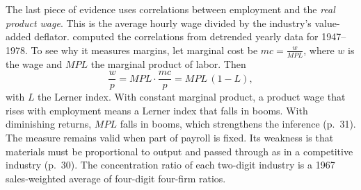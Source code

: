 The last piece of evidence uses correlations between employment and the \emph{real product wage}. This is the average
hourly wage divided by the industry's value-added deflator. \citet{Burda1984} computed the correlations from detrended
yearly data for 1947--1978. To see why it measures margins, let marginal cost be $mc = \frac{w}{MPL}$, where $w$ is the wage and $MPL$
the marginal product of labor. Then
\begin{equation*}
\frac{w}{p} = MPL \cdot \frac{mc}{p} = MPL\,(1 - L),
\end{equation*}
with $L$ the Lerner index. With constant marginal product, a product wage that rises with employment means a Lerner
index that falls in booms. With diminishing returns, $MPL$ falls in booms, which strengthens the inference (p.~31). The
measure remains valid when part of payroll is fixed. Its weakness is that materials must be proportional to output and
passed through as in a competitive industry (p.~30). The concentration ratio of each two-digit industry is a 1967
sales-weighted average of four-digit four-firm ratios.

